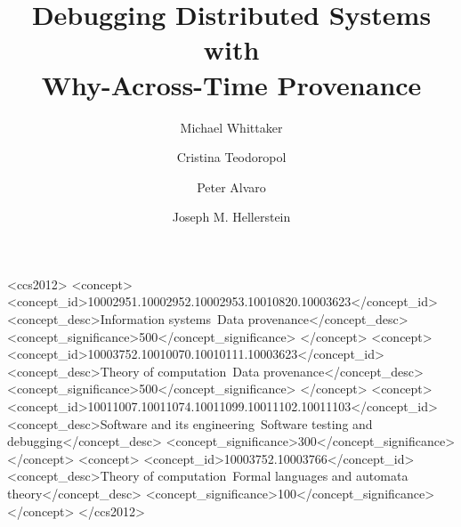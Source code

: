 \documentclass[sigconf, 10pt]{acmart}
\begin{document}
\title{Debugging Distributed Systems with\\Why-Across-Time Provenance}

\author{Michael Whittaker}

\author{Cristina Teodoropol}

\author{Peter Alvaro}

\author{Joseph M. Hellerstein}
\renewcommand{\shortauthors}{M. Whittaker, C. Teodoropol, P. Alvaro, J. Hellerstein}

{}

\begin{CCSXML}
<ccs2012>
<concept>
<concept_id>10002951.10002952.10002953.10010820.10003623</concept_id>
<concept_desc>Information systems~Data provenance</concept_desc>
<concept_significance>500</concept_significance>
</concept>
<concept>
<concept_id>10003752.10010070.10010111.10003623</concept_id>
<concept_desc>Theory of computation~Data provenance</concept_desc>
<concept_significance>500</concept_significance>
</concept>
<concept>
<concept_id>10011007.10011074.10011099.10011102.10011103</concept_id>
<concept_desc>Software and its engineering~Software testing and debugging</concept_desc>
<concept_significance>300</concept_significance>
</concept>
<concept>
<concept_id>10003752.10003766</concept_id>
<concept_desc>Theory of computation~Formal languages and automata theory</concept_desc>
<concept_significance>100</concept_significance>
</concept>
</ccs2012>
\end{CCSXML}



\maketitle
{}
{}
{}
{}
{}
{}
{}
{}



\end{document}
